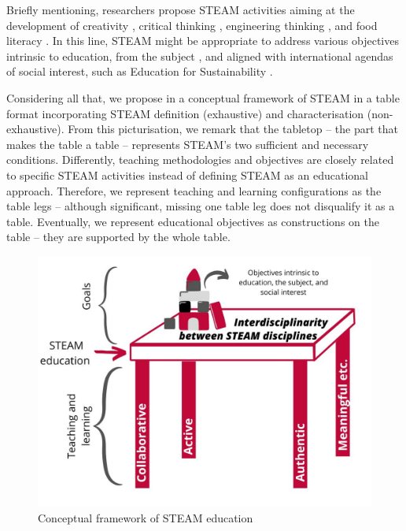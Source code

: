 \documentclass[english]{textolivre}
\begin{document}
Briefly mentioning, researchers propose STEAM activities aiming at the development of creativity \cite{aguilera_stem_2021}, critical thinking \cite{bassachs_fostering_2020}, engineering thinking \cite{rodrigues2023}, and food literacy \cite{silva-hormazabal_conectando_2022}. In this line, STEAM might be appropriate to address various objectives intrinsic to education, from the subject \cite{biesta_risking_2020}, and aligned with international agendas of social interest, such as Education for Sustainability \cite{guyotte_toward_2020, vasquez_education_2021}.

Considering all that, we propose in  a conceptual framework of STEAM in a table format incorporating STEAM definition (exhaustive) and characterisation (non-exhaustive). From this picturisation, we remark that the tabletop – the part that makes the table a table – represents STEAM’s two sufficient and necessary conditions. Differently, teaching methodologies and objectives are closely related to specific STEAM activities instead of defining STEAM as an educational approach. Therefore, we represent teaching and learning configurations as the table legs – although significant, missing one table leg does not disqualify it as a table. Eventually, we represent educational objectives as constructions on the table – they are supported by the whole table.

\begin{figure}[htbp]
\centering
\begin{minipage}{.8\textwidth}
 \includegraphics[width=\textwidth]{imagem4.jpg}
 \caption{Conceptual framework of STEAM education}
 \label{fig4}
\end{minipage}
\end{figure}
\end{document}
